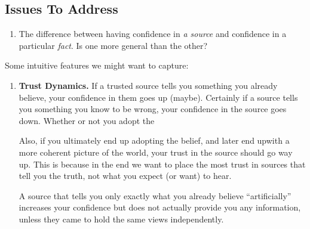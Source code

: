 \documentclass{article}
\begin{document}
\subsection*{Issues To Address}
\begin{enumerate}
    \item The difference between having confidence in \emph{a source} and confidence in a particular \emph{fact}.  Is one more general than the other?
\end{enumerate}

Some intuitive features we might want to capture:
\begin{enumerate}

    \item \textbf{Trust Dynamics.} If a trusted source tells you something you already believe, your confidence in them goes up (maybe). Certainly if a source tells you something you know to be wrong, your confidence in the source goes down.  Whether or not you adopt the

    Also, if you ultimately end up adopting the belief, and later end upwith a more coherent picture of the world, your trust in the source should go way up.
    This is because in the end we want to place the most trust in sources that tell you the truth, not what you expect (or want) to hear.

    A source that tells you only exactly what you already believe ``artificially'' increases your confidence but does not actually provide you any information, unless they came to hold the same views independently.

\end{enumerate}

\TODO
\clearpage
\end{document}
